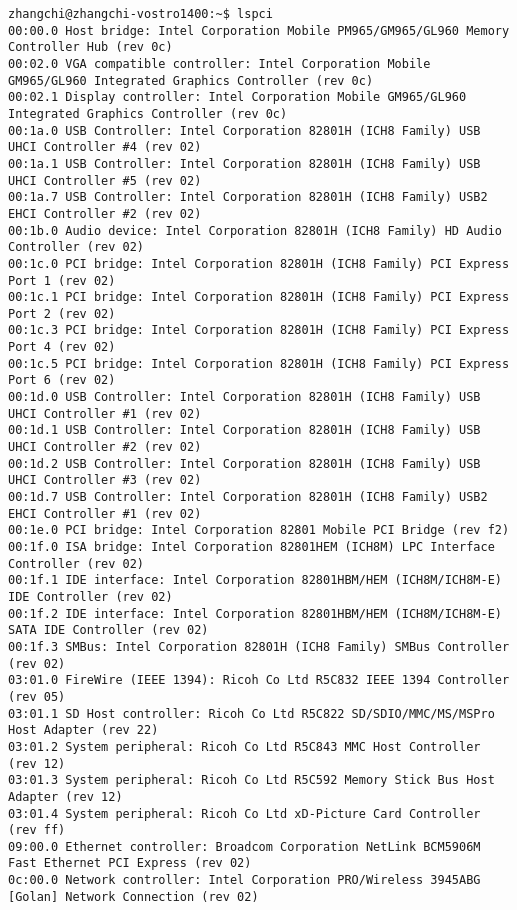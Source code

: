 \documentclass{article}
\begin{document}
\begin{CJK*}{UTF8}{gkai}
\begin{description}
\begin{lstlisting}[style=console, basicstyle=\tiny\color{green}\ttfamily\bfseries]
zhangchi@zhangchi-vostro1400:~$ lspci 
00:00.0 Host bridge: Intel Corporation Mobile PM965/GM965/GL960 Memory Controller Hub (rev 0c)
00:02.0 VGA compatible controller: Intel Corporation Mobile GM965/GL960 Integrated Graphics Controller (rev 0c)
00:02.1 Display controller: Intel Corporation Mobile GM965/GL960 Integrated Graphics Controller (rev 0c)
00:1a.0 USB Controller: Intel Corporation 82801H (ICH8 Family) USB UHCI Controller #4 (rev 02)
00:1a.1 USB Controller: Intel Corporation 82801H (ICH8 Family) USB UHCI Controller #5 (rev 02)
00:1a.7 USB Controller: Intel Corporation 82801H (ICH8 Family) USB2 EHCI Controller #2 (rev 02)
00:1b.0 Audio device: Intel Corporation 82801H (ICH8 Family) HD Audio Controller (rev 02)
00:1c.0 PCI bridge: Intel Corporation 82801H (ICH8 Family) PCI Express Port 1 (rev 02)
00:1c.1 PCI bridge: Intel Corporation 82801H (ICH8 Family) PCI Express Port 2 (rev 02)
00:1c.3 PCI bridge: Intel Corporation 82801H (ICH8 Family) PCI Express Port 4 (rev 02)
00:1c.5 PCI bridge: Intel Corporation 82801H (ICH8 Family) PCI Express Port 6 (rev 02)
00:1d.0 USB Controller: Intel Corporation 82801H (ICH8 Family) USB UHCI Controller #1 (rev 02)
00:1d.1 USB Controller: Intel Corporation 82801H (ICH8 Family) USB UHCI Controller #2 (rev 02)
00:1d.2 USB Controller: Intel Corporation 82801H (ICH8 Family) USB UHCI Controller #3 (rev 02)
00:1d.7 USB Controller: Intel Corporation 82801H (ICH8 Family) USB2 EHCI Controller #1 (rev 02)
00:1e.0 PCI bridge: Intel Corporation 82801 Mobile PCI Bridge (rev f2)
00:1f.0 ISA bridge: Intel Corporation 82801HEM (ICH8M) LPC Interface Controller (rev 02)
00:1f.1 IDE interface: Intel Corporation 82801HBM/HEM (ICH8M/ICH8M-E) IDE Controller (rev 02)
00:1f.2 IDE interface: Intel Corporation 82801HBM/HEM (ICH8M/ICH8M-E) SATA IDE Controller (rev 02)
00:1f.3 SMBus: Intel Corporation 82801H (ICH8 Family) SMBus Controller (rev 02)
03:01.0 FireWire (IEEE 1394): Ricoh Co Ltd R5C832 IEEE 1394 Controller (rev 05)
03:01.1 SD Host controller: Ricoh Co Ltd R5C822 SD/SDIO/MMC/MS/MSPro Host Adapter (rev 22)
03:01.2 System peripheral: Ricoh Co Ltd R5C843 MMC Host Controller (rev 12)
03:01.3 System peripheral: Ricoh Co Ltd R5C592 Memory Stick Bus Host Adapter (rev 12)
03:01.4 System peripheral: Ricoh Co Ltd xD-Picture Card Controller (rev ff)
09:00.0 Ethernet controller: Broadcom Corporation NetLink BCM5906M Fast Ethernet PCI Express (rev 02)
0c:00.0 Network controller: Intel Corporation PRO/Wireless 3945ABG [Golan] Network Connection (rev 02)
\end{lstlisting}


\end{description}
\end{CJK*}
\end{document}
